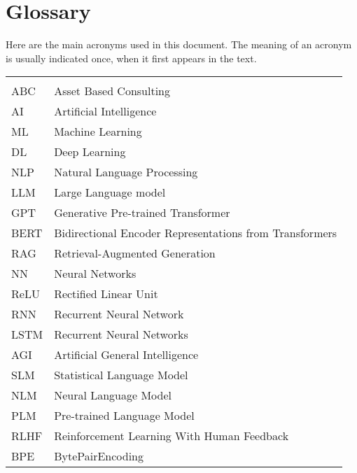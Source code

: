 \chapter*{Glossary}

Here are the main acronyms used in this document. The meaning of an acronym is usually indicated once, when it first appears in the text.

\begin{longtable}{lp{9cm}}
         &                                                         \\
    ABC  & Asset Based Consulting                                  \\
    AI   & Artificial Intelligence                                 \\
    ML   & Machine Learning                                        \\
    DL   & Deep Learning                                           \\
    NLP  & Natural Language Processing                             \\
    LLM  & Large Language model                                    \\
    GPT  & Generative Pre-trained Transformer                      \\
    BERT & Bidirectional Encoder Representations from Transformers \\
    RAG  & Retrieval-Augmented Generation                          \\
    NN   & Neural Networks                                         \\
    ReLU & Rectified Linear Unit                                   \\
    RNN  & Recurrent Neural Network                                \\
    LSTM & Recurrent Neural Networks                               \\
    AGI  & Artificial General Intelligence                         \\
    SLM  & Statistical Language Model                              \\
    NLM  & Neural Language Model                                   \\
    PLM  & Pre-trained Language Model                              \\
    RLHF & Reinforcement Learning With Human Feedback              \\
    BPE  & BytePairEncoding                                        \\
\end{longtable}

